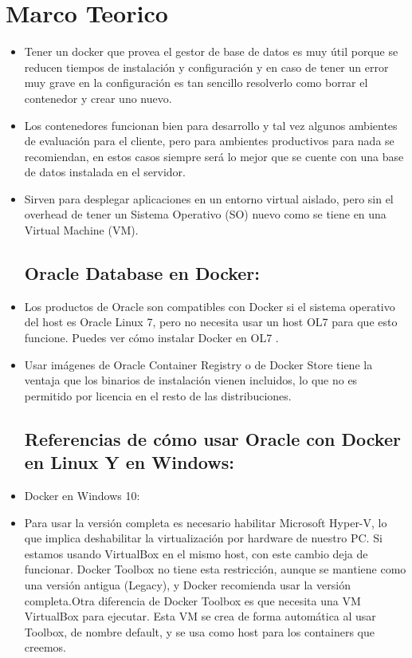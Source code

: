 \section{Marco Teorico} 

\begin{itemize}
\subsection{ Docker:}
	\item Tener un docker que provea el gestor de base de datos es muy útil porque se reducen tiempos de instalación y configuración y en caso de tener un error muy grave en la configuración es tan sencillo resolverlo como borrar el contenedor y crear uno nuevo.
          \item Los contenedores funcionan bien para desarrollo y tal vez algunos ambientes de evaluación para el cliente, pero para ambientes productivos para nada se recomiendan, en estos casos siempre será lo mejor que se cuente con una base de datos instalada en el servidor.
         \item Sirven para desplegar aplicaciones en un entorno virtual aislado, pero sin el overhead de tener un Sistema Operativo (SO) nuevo como se tiene en una Virtual Machine (VM).

\subsection{Oracle Database en Docker:}
	\item Los productos de Oracle son compatibles con Docker si el sistema operativo del host es Oracle Linux 7, pero no necesita usar un host OL7 para que esto funcione. Puedes ver cómo instalar Docker en OL7 .
	\item Usar imágenes de Oracle Container Registry o de Docker Store tiene la ventaja que los binarios de instalación vienen incluidos, lo que no es permitido por licencia en el resto de las distribuciones. 
\subsection{Referencias de cómo usar Oracle con Docker en Linux Y  en Windows:}
	\item Docker en Windows 10:
	\item Para usar la versión completa es necesario habilitar Microsoft Hyper-V, lo que implica deshabilitar la virtualización por hardware de nuestro PC. Si estamos usando VirtualBox en el mismo host, con este cambio deja de funcionar.
Docker Toolbox no tiene esta restricción, aunque se mantiene como una versión antigua (Legacy), y Docker recomienda usar la versión completa.Otra diferencia de Docker Toolbox es que necesita una VM VirtualBox para ejecutar. Esta VM se crea de forma automática al usar Toolbox, de nombre default, y se usa como host para los containers que creemos.

\end{itemize}
